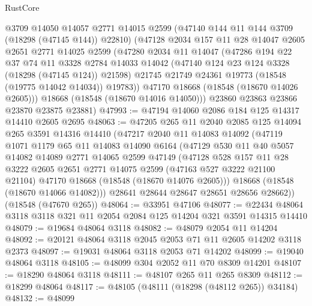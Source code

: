 \begin{lexlean}{RustCore}
\begin{coremodule}
        @3709
        @14050
        @14057
        @2771
        @14015
        @2599
        (@47140 @144 @11 @144 @3709 (@18298 (@47145 @144)) @22810)
        (@47128
          @2034
          @157
          @11
          @28
          @14047
          @2605
          @2651
          @2771
          @14025
          @2599
          (@47280
            @2034
            @11
            @14047
            (@47286
              @194
              @22
              @37
              @74
              @11
              @3328
              @2784
              @14033
              @14042
              (@47140 @124 @23 @124 @3328 (@18298 (@47145 @124)) @21598)
              @21745
              @21749
              @24361
              @19773
              (@18548 (@19775 @14042 @14034))
              @19783))
          @47170
          @18668
          (@18548 (@18670 @14026 @2605)))
        @18668
        (@18548 (@18670 @14016 @14050)))
      @23860
      @23863
      @23866
      @23870
      @23875
      @23881)
@47993 := @47194 @14060 @2086 @184 @125 @14317 @14410 @2605 @2695
@48063 := @47205
    @265
    @11
    @2040
    @2085
    @125
    @14094
    @265
    @3591
    @14316
    @14410
    (@47217
      @2040
      @11
      @14083
      @14092
      (@47119
        @1071
        @1179
        @65
        @11
        @14083
        @14090
        @6164
        (@47129
          @530
          @11
          @40
          @5057
          @14082
          @14089
          @2771
          @14065
          @2599
          @47149
          (@47128
            @528
            @157
            @11
            @28
            @3222
            @2605
            @2651
            @2771
            @14075
            @2599
            (@47163 @527 @3222 @21100 @21104)
            @47170
            @18668
            (@18548 (@18670 @14076 @2605)))
          @18668
          (@18548 (@18670 @14066 @14082)))
        @28641
        @28644
        @28647
        @28651
        @28656
        @28662))
    (@18548 (@47670 @265))
@48064 := @33951 @47106
@48077 := @22434 @48064 @3118 @3118 @321 @11 @2054 @2084 @125 @14204 @321 @3591 @14315 @14410
@48079 := @19684 @48064 @3118
@48082 := @48079 @2054 @11 @14204
@48092 := @20121 @48064 @3118 @2045 @2053 @71 @11 @2605 @14202 @3118 @2373
@48097 := @19031 @48064 @3118 @2053 @71 @14202
@48099 := @19040 @48064 @3118
@48105 := @48099 @304 @2052 @11 @70 @8309 @14201
@48107 := @18290 @48064 @3118
@48111 := @48107 @265 @11 @265 @8309
@48112 := @18299 @48064
@48117 := @48105 (@48111 (@18298 (@48112 @265)) @34184)
@48132 := @48099

\end{coremodule}
\end{lexlean}
